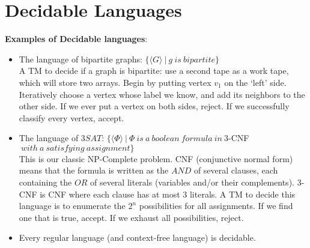 


\section*{Decidable Languages}


\textbf{Examples of Decidable languages}:
\begin{itemize}
	\item The language of bipartite graphs: $\{\langle G\rangle \ | \ g\ is \ bipartite\}$\\
	A TM to decide if a graph is bipartite: use a second tape as a work tape, which will store two arrays.  Begin by putting vertex $v_1$ on the `left' side.  Iteratively choose a vertex whose label we know, and add its neighbors to the other side.  If we ever put a vertex on both sides, reject.  If we successfully classify every vertex, accept.\\
	
	
	\item The language of $3SAT$: $\{\langle \Phi \rangle \ | \ \Phi \ is \ a \ boolean  \ formula \ in \ $3-CNF$ \ with \ a \ satisfying \ assignment\}$\\
	This is our classic NP-Complete problem.  CNF (conjunctive normal form) means that the formula is written as the $AND$ of several clauses, each containing the $OR$ of several literals (variables and/or their complements).  3-CNF is CNF where each clause has at most 3 literals.  A TM to decide this language is to enumerate the $2^n$ possibilities for all assignments.  If we find one that is true, accept.  If we exhaust all possibilities, reject.
	
	\item Every regular language (and context-free language) is decidable.
	
\end{itemize}



